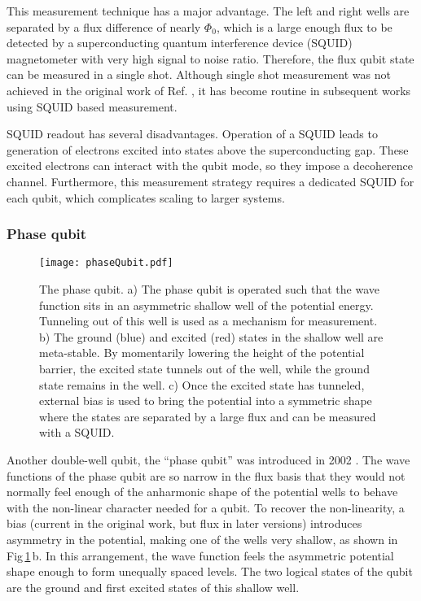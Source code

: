 This measurement technique has a major advantage.
The left and right wells are separated by a flux difference of nearly $\Phi_0$, which is a large enough flux to be detected by a superconducting quantum interference device (SQUID) magnetometer with very high signal to noise ratio.
Therefore, the flux qubit state can be measured in a single shot.
Although single shot measurement was not achieved in the original work of Ref. \cite{VanderWal:persistentCurrent2000}, it has become routine in subsequent works using SQUID based measurement.

SQUID readout has several disadvantages.
Operation of a SQUID leads to generation of electrons excited into states above the superconducting gap.
These excited electrons can interact with the qubit mode, so they impose a decoherence channel.
Furthermore, this measurement strategy requires a dedicated SQUID for each qubit, which complicates scaling to larger systems.

\subsubsection{Phase qubit}

\begin{figure}
\begin{centering}
\texttt{[image: phaseQubit.pdf]} 
\par\end{centering}
\caption{The phase qubit. a) The phase qubit is operated such that the wave function sits in an asymmetric shallow well of the potential energy. Tunneling out of this well is used as a mechanism for measurement. b) The ground (blue) and excited (red) states in the shallow well are meta-stable. By momentarily lowering the height of the potential barrier, the excited state tunnels out of the well, while the ground state remains in the well. c) Once the excited state has tunneled, external bias is used to bring the potential into a symmetric shape where the states are separated by a large flux and can be measured with a SQUID.}
\label{Fig:phaseQubit}
\end{figure}

Another double-well qubit, the ``phase qubit'' was introduced in 2002 \cite{Martinis:rabi2002}.
The wave functions of the phase qubit are so narrow in the flux basis that they would not normally feel enough of the anharmonic shape of the potential wells to behave with the non-linear character needed for a qubit.
To recover the non-linearity, a bias (current in the original work, but flux in later versions) introduces asymmetry in the potential, making one of the wells very shallow, as shown in Fig\,\ref{Fig:phaseQubit}\,b.
In this arrangement, the wave function feels the asymmetric potential shape enough to form unequally spaced levels.
The two logical states of the qubit are the ground and first excited states of this shallow well.

